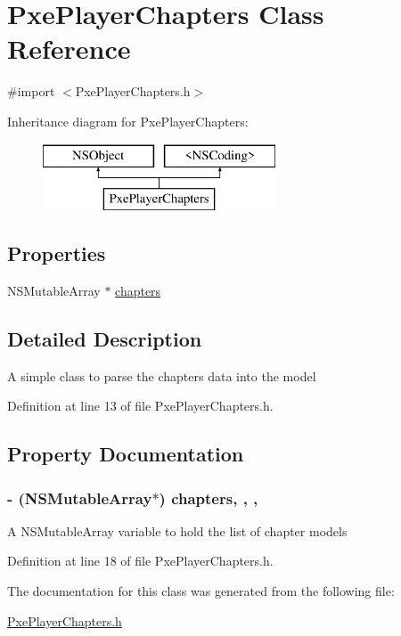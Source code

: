\hypertarget{interface_pxe_player_chapters}{\section{Pxe\-Player\-Chapters Class Reference}
\label{interface_pxe_player_chapters}
}


{\ttfamily \#import $<$Pxe\-Player\-Chapters.\-h$>$}

Inheritance diagram for Pxe\-Player\-Chapters\-:\begin{figure}[H]
\begin{center}
\leavevmode
\includegraphics[height=2.000000cm]{interface_pxe_player_chapters}
\end{center}
\end{figure}
\subsection*{Properties}
\begin{DoxyCompactItemize}
\item 
N\-S\-Mutable\-Array $\ast$ \hyperlink{interface_pxe_player_chapters_ab2fcdf556f402aac5fca9abd56a46fe4}{chapters}
\end{DoxyCompactItemize}


\subsection{Detailed Description}
A simple class to parse the chapters data into the model 

Definition at line 13 of file Pxe\-Player\-Chapters.\-h.



\subsection{Property Documentation}
\hypertarget{interface_pxe_player_chapters_ab2fcdf556f402aac5fca9abd56a46fe4}{
\subsubsection[{chapters}]{\setlength{\rightskip}{0pt plus 5cm}-\/ (N\-S\-Mutable\-Array$\ast$) chapters\hspace{0.3cm}{\ttfamily [read]}, {\ttfamily [write]}, {\ttfamily [nonatomic]}, {\ttfamily [strong]}}}\label{interface_pxe_player_chapters_ab2fcdf556f402aac5fca9abd56a46fe4}
A N\-S\-Mutable\-Array variable to hold the list of chapter models 

Definition at line 18 of file Pxe\-Player\-Chapters.\-h.



The documentation for this class was generated from the following file\-:\begin{DoxyCompactItemize}
\item 
\hyperlink{_pxe_player_chapters_8h}{Pxe\-Player\-Chapters.\-h}\end{DoxyCompactItemize}
